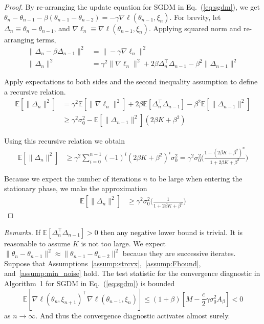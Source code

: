 \documentclass[conference]{IEEEtran}
\newcommand{\Ex}[1]{\mathbb{E}[ #1 ]}
\newenvironment{customthm}[1]
   {\renewcommand\theinnercustomthm{#1}\innercustomthm}
   {\endinnercustomthm}
\begin{document}
\begin{proof}
By re-arranging the update equation for SGDM in Eq.~(\ref{eq:sgdm}), 
we get $\theta_n - \theta_{n-1} - \beta ( \theta_{n-1} - \theta_{n-2} ) = - \gamma \nabla \ell ( \theta_{n-1}, \xi_n )$.
For brevity, let $\Delta_n \equiv \theta_n - \theta_{n-1}$, and $\nabla \ell_n \equiv \nabla \ell ( \theta_{n-1}, \xi_n )$.
Applying squared norm and re-arranging terms,
\begin{align*}
\| \Delta_n - \beta \Delta_{n-1} \|^2 &= \| - \gamma \nabla \ell_n \|^2 \\
\| \Delta_n \|^2 &= \gamma^2 \| \nabla \ell_n \|^2 + 2 \beta \Delta_n^\top \Delta_{n-1} - \beta^2 \| \Delta_{n-1} \|^2
\end{align*}

Apply expectations to both sides and the second inequality assumption to define a recursive relation.
\begin{align*}
\Ex{ \| \Delta_n \|^2 } &= \gamma^2 \Ex{ \| \nabla \ell_n \|^2 } + 2 \beta \Ex{ \Delta_n^\top \Delta_{n-1} } - \beta^2 \Ex{ \| \Delta_{n-1} \|^2 } \\
&\geq \gamma^2 \sigma_0^2 - \Ex{ \| \Delta_{n-1} \|^2 } ( 2 \beta K + \beta^2 )
\end{align*}

Using this recursive relation we obtain
\begin{align*}
\Ex{ \| \Delta_n \|^2 } &\geq \gamma^2 \sum_{i=0}^{n-1} ( -1 )^{i} ( 2 \beta K + \beta^2 )^{i} \sigma_0^2 
= \gamma^2 \sigma_0^2 \biggl( \frac{1 - ( 2 \beta K + \beta^2 )^n}{1 + 2 \beta K + \beta^2} \biggr)
\end{align*}

Because we expect the number of iterations $n$ to be large when entering the stationary phase, we make the approximation
\begin{align*}
\Ex{ \| \Delta_n \|^2 } &\geq \gamma^2 \sigma_0^2 \biggl( \frac{1}{1 + 2 \beta K + \beta^2} \biggr)
\end{align*}
\end{proof}
\emph{Remarks.}
If $\Ex{ \Delta_n^\top \Delta_{n-1} } > 0$ then any negative lower bound is trivial. 
It is reasonable to assume $K$ is not too large.
We expect $\| \theta_{n} - \theta_{n-1} \|^2 \approx \| \theta_{n-1} - \theta_{n-2} \|^2$ because they are successive iterates. \\

\begin{customthm}{\ref{thm:ip_exp_bd}}
Suppose that Assumptions~\ref{assump:strcvx},~\ref{assump:Fbound}, and~\ref{assump:min_noise} hold.  The test statistic for the convergence diagnostic in Algorithm~1 for SGDM in Eq.~(\ref{eq:sgdm}) 
is bounded 
\begin{equation*}
\mathbb{E} [ \nabla \ell ( \theta_n, \xi_{n+1} )^\top \nabla \ell ( \theta_{n-1}, \xi_n ) ] 
\leq ( 1 + \beta ) \left[ M - \frac{c}{2} \gamma \sigma_0^2 A_\beta \right]
< 0
\end{equation*}
as $n \rightarrow \infty$.
And thus the convergence diagnostic activates almost surely.
\end{customthm}
\end{document}
